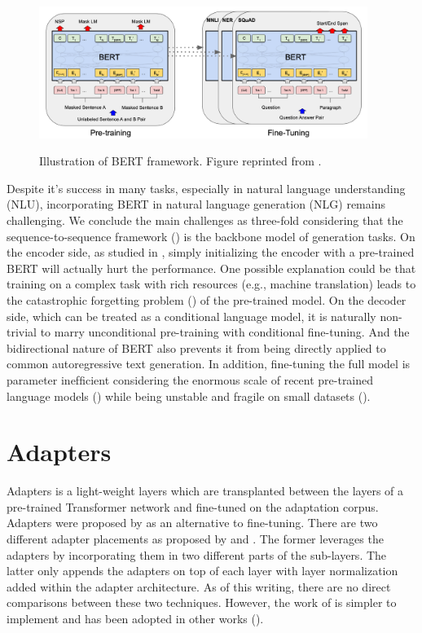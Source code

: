 \begin{figure}[h]
    {\includegraphics[width=0.95\textwidth]{img/bert.png}}
    \centering
    \caption{Illustration of BERT framework. Figure reprinted from \cite{devlin2018bert}.}
    \label{img:bert}
\end{figure}

Despite it's success in many tasks, especially in natural language understanding (NLU), incorporating BERT in natural language generation (NLG) remains challenging. We conclude the main challenges as three-fold considering that the sequence-to-sequence framework (\cite{sutskever2014sequence}) is the backbone model of generation tasks. On the encoder side, as studied in \cite{Zhu2020IncorporatingBI}, simply initializing the encoder with a pre-trained BERT will actually hurt the performance. One possible explanation could be that training on a complex task with rich resources (e.g., machine translation) leads to the catastrophic forgetting problem (\cite{mccloskey1989catastrophic}) of the pre-trained model. On the decoder side, which can be treated as a conditional language model, it is naturally non-trivial to marry unconditional pre-training with conditional ﬁne-tuning. And the bidirectional nature of BERT also prevents it from being directly applied to common autoregressive text generation. In addition, ﬁne-tuning the full model is parameter inefﬁcient considering the enormous scale of recent pre-trained language models (\cite{ratford2019language}) while being unstable and fragile on small datasets (\cite{Lee2020MixoutER}).

\section{Adapters}
\label{sec:bm_adapters}
Adapters is a light-weight layers which are transplanted between the layers of a pre-trained Transformer network and fine-tuned on the adaptation corpus. Adapters were proposed by \cite{houlsby2019parameter} as an alternative to fine-tuning. There are two different adapter placements as proposed by \cite{bapna2019simple} and \cite{houlsby2019parameter}. The former leverages the adapters by incorporating them in two different parts of the sub-layers. The latter only appends the adapters on top of each layer with layer normalization added within the adapter architecture. As of this writing, there are no direct comparisons between these two techniques. However, the work of \cite{bapna2019simple} is simpler to implement and has been adopted in other works (\cite{pfeiffer2020madx,ruckle2020adapterdrop,pfeiffer2021adapterfusion}).

